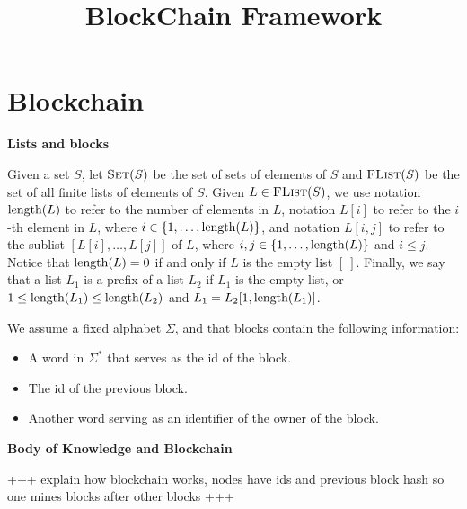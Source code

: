 \documentclass{article}
\begin{document}

\title{BlockChain Framework}




\pagestyle{empty} %
\thispagestyle{empty}

\section{Blockchain}

\medskip
\noindent
\textbf{Lists and blocks}

Given a set $S$, let $\text{\sc Set}(S)$ be the set of sets of elements of $S$ and $\text{\sc FList}(S)$ be the set of all finite lists of elements of $S$. Given $L \in \text{\sc FList}(S)$, we use notation $\text{\rm length}(L)$ to refer to the number of elements in $L$, notation $L[i]$ to refer to the $i$-th element in $L$, where $i \in \{1, \ldots, \text{\rm length}(L)\}$, and notation $L[i,j]$ to refer to the sublist $[L[i], \ldots, L[j]]$ of $L$, where $i,j \in \{1, \ldots, \text{\rm length}(L)\}$ and $i \leq j$. Notice that $\text{\rm length}(L) = 0$ if and only if $L$ is the empty list $[\ ]$. Finally, we say that a list $L_1$ is a prefix of a list $L_2$ if $L_1$ is the empty list, or $1 \leq \text{\rm length}(L_1) \leq \text{\rm length}(L_2)$ and $L_1 = L_2[1, \text{\rm length}(L_1)]$. 

We assume a fixed alphabet $\Sigma$, and that blocks contain the following information: 
\begin{itemize}
\item A word in $\Sigma^*$ that serves as the id of the block. 
\item The id of the previous block. 
\item Another word serving as an identifier of the owner of the block. 
\end{itemize}


\medskip
\noindent
\textbf{Body of Knowledge and Blockchain}

+++ explain how blockchain works, nodes have ids and previous block hash so one mines blocks after other blocks +++
\end{document}
